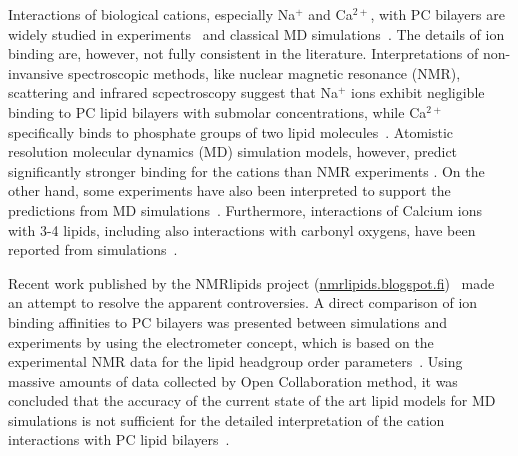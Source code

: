 \documentclass[aip,jcp,twocolumn]{revtex4}
\begin{document}
Interactions of biological cations, especially Na$^+$ and
Ca$^{2+}$, with PC bilayers are widely studied in
experiments~\cite{akutsu81,altenbach84,seelig90,cevc90,tocanne90,binder02,pabst07,uhrikova08}
and classical MD simulations~\cite{bockmann03,bockmann04,Berkowitz12,melcrova16,javanainen17}.
The details of ion binding are, however, not fully consistent in the literature.
Interpretations of non-invansive spectroscopic methods, like nuclear magnetic resonance (NMR), scattering
and infrared scpectroscopy suggest that Na$^+$ ions exhibit
negligible binding to PC lipid bilayers with submolar concentrations, while Ca$^{2+}$ specifically
binds to phosphate groups of two lipid molecules~\cite{hauser76,hauser78,herbette84,akutsu81,altenbach84,binder02,pabst07,uhrikova08}.
Atomistic resolution molecular dynamics (MD) simulation models, however, predict significantly
stronger binding for the cations than NMR experiments \cite{catte16}.
On the other hand, some experiments have also been interpreted to support the predictions from
MD simulations~\cite{bockmann03,vacha09a}. 
Furthermore, interactions of Calcium ions with 3-4 lipids,
including also interactions with carbonyl
oxygens, have been reported from simulations~\cite{bockmann03,bockmann04,melcrova16,javanainen17}.


Recent work published by the NMRlipids project (\url{nmrlipids.blogspot.fi})~\cite{catte16}
made an attempt to resolve the apparent controversies. A direct comparison of
ion binding affinities to PC bilayers was presented between simulations and
experiments by using the electrometer concept, which is based on the experimental NMR data
for the lipid headgroup order parameters~\cite{seelig87}.
Using massive amounts of data collected by Open Collaboration method, it was concluded
that the accuracy of the current state of the art lipid models for MD
simulations is not sufficient for the detailed interpretation of the cation
interactions with PC lipid bilayers~\cite{catte16}.

\end{document}
